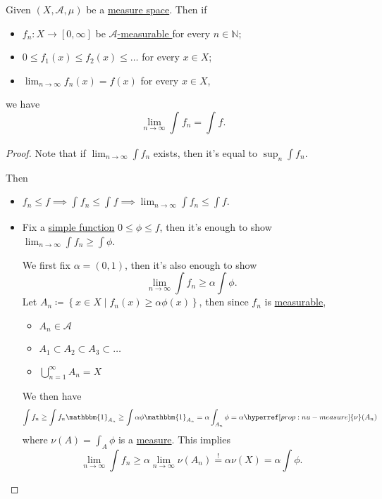 \begin{theorem}\label{thm:MCT}
	Given \((X, \mathcal{A}, \mu)\) be a \hyperref[def:measure-space]{measure space}. Then if
	\begin{itemize}
		\item \(f_{n}\colon X\to [0, \infty ]\) be \hyperref[def:A-measurable-function]{\(\mathcal{A}\)-measurable } for every \(n\in\mathbb{N} \);
		\item \(0\leq f_1(x)\leq f_2(x)\leq \dots  \) for every \(x\in X\);
		\item \(\lim_{n \to \infty} f_{n}(x) = f(x)\) for every \(x\in X\),
	\end{itemize}
	we have
	\[
		\lim_{n \to \infty} \int_{}^{} f_{n} = \int_{}^{} f.
	\]
\end{theorem}
\begin{proof}
	Note that if \(\lim_{n \to \infty} \int f_{n}\) exists, then it's equal to \(\sup _n \int f_{n}\).

	\par Then
	\begin{itemize}
		\item \(f_{n}\leq f \implies \int_{}^{} f_{n}\leq \int_{}^{} f\implies \lim_{n \to \infty} \int f_{n}\leq \int f\).
		\item Fix a \hyperref[def:simple-function]{simple function} \(0\leq \phi \leq f\), then it's enough to show \(\lim_{n \to \infty} \int f_{n}\geq \int \phi \).
		      \par We first fix \(\alpha = (0, 1)\), then it's also enough to show
		      \[
			      \lim_{n \to \infty} \int f_{n}\geq \alpha \int \phi.
		      \]
		      Let \(A_{n} \coloneqq \left\{x\in X\mid f_{n}(x) \geq \alpha \phi (x)\right\}\), then since \(f_{n}\) is \hyperref[def:measurable-function]{measurable},
		      \begin{itemize}
			      \item \(A_{n}\in \mathcal{A} \)
			      \item \(A_1\subset A_2\subset A_3\subset\dots  \)
			      \item \(\bigcup_{n=1}^{\infty} A_{n} = X\) 
		      \end{itemize}
		      We then have
		      \[
			      \int f_{n}\geq \int f_{n}\mathbbm{1}_{A_{n}} \geq \int \alpha \phi \mathbbm{1}_{A_{n}} = \alpha \int_{A_{n}}\phi = \alpha \hyperref[prop:nu-measure]{\nu} (A_{n})
		      \]
		      where \(\hyperref[prop:nu-measure]{\nu}(A) = \int_{A}^{} \phi \) is a \hyperref[def:measure]{measure}. This implies
		      \[
			      \lim_{n \to \infty} \int f_{n}\geq \alpha \lim_{n \to \infty} \hyperref[prop:nu-measure]{\nu } (A_{n}) \overset{\hyperref[thm:measure-space-continuity-from-below]{!}}{=} \alpha \hyperref[prop:nu-measure]{\nu}(X) = \alpha \int \phi.
		      \]
	\end{itemize}
\end{proof}

